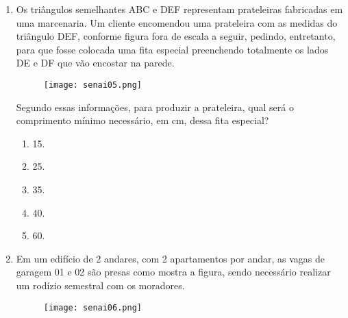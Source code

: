 \documentclass[a4paper,14pt]{article}
\begin{document}
\begin{enumerate}
	    \item Os triângulos semelhantes ABC e DEF representam prateleiras fabricadas em uma marcenaria. Um
	    cliente encomendou uma prateleira com as medidas do triângulo DEF, conforme figura fora de escala a
	    seguir, pedindo, entretanto, para que fosse colocada uma fita especial preenchendo totalmente os lados
	    DE e DF que vão encostar na parede.
	    \newline
	    \newline
	    \newline
	    \newline
	    \newline
	    \newline
	    \newline
	    \newline
	    \newline
	    \newline
	    \newline
	    \newline
	    \newline
        \begin{figure}[h] %
        	\centering
        	\texttt{[image: senai05.png]} %
        \end{figure}
        Segundo essas informações, para produzir a prateleira, qual será o comprimento mínimo necessário,
        em cm, dessa fita especial?
        \begin{enumerate}
        	\item 15.
        	\item 25.
        	\item 35.
        	\item 40.
        	\item 60.
        \end{enumerate}
    
        \item Em um edifício de 2 andares, com 2 apartamentos por andar, as vagas de garagem 01 e 02 são presas
        como mostra a figura, sendo necessário realizar um rodízio semestral com os moradores.
        
        \begin{figure}[h] %
        	\centering
        	\texttt{[image: senai06.png]} %
        \end{figure}
    

\end{enumerate}
\end{document}
